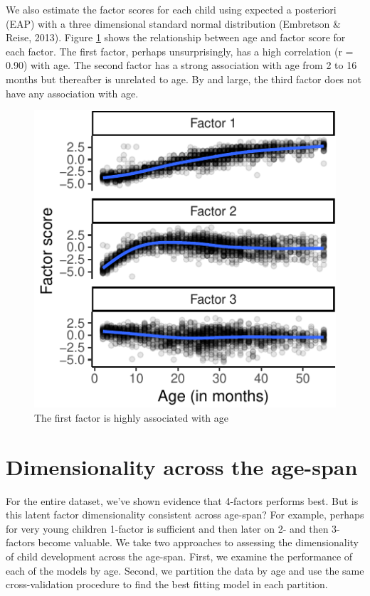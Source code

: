 \documentclass[10pt, letterpaper]{article}
\newenvironment{CodeChunk}{}{}
\begin{document}
We also estimate the factor scores for each child using expected a
posteriori (EAP) with a three dimensional standard normal distribution
(Embretson \& Reise, 2013). Figure \ref{fig:factorscores} shows the
relationship between age and factor score for each factor. The first
factor, perhaps unsurprisingly, has a high correlation (r = 0.90) with
age. The second factor has a strong association with age from 2 to 16
months but thereafter is unrelated to age. By and large, the third
factor does not have any association with age.

\begin{CodeChunk}
\begin{figure}[tb]
\includegraphics{figs/factorscores-1} \caption[The first factor is highly associated with age]{The first factor is highly associated with age}\label{fig:factorscores}
\end{figure}
\end{CodeChunk}

\hypertarget{dimensionality-across-the-age-span}{%
\section{Dimensionality across the
age-span}\label{dimensionality-across-the-age-span}}

For the entire dataset, we've shown evidence that 4-factors performs
best. But is this latent factor dimensionality consistent across
age-span? For example, perhaps for very young children 1-factor is
sufficient and then later on 2- and then 3-factors become valuable. We
take two approaches to assessing the dimensionality of child development
across the age-span. First, we examine the performance of each of the
models by age. Second, we partition the data by age and use the same
cross-validation procedure to find the best fitting model in each
partition.
\end{document}
